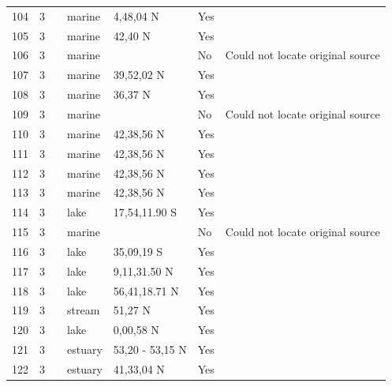 \documentclass[12pt]{article}
\begin{document}
\begin{landscape}
\begin{table}[h!]
{\begin{tabular}{p{2.8cm}p{1.3cm}p{3cm}p{2.2cm}p{2.5cm}lp{8.2cm}}
        104   & 3 & \cite{Menge1976}  & marine & 4,48,04 N & Yes   &       \\
        105   & 3 & \cite{Edwards1982}  & marine & 42,40 N & Yes   &       \\
        106   & 3 & \cite{Glynn1965}  & marine &       & No    & Could not locate original source \\
        107   & 3 & \cite{Peterson1979}  & marine & 39,52,02 N & Yes   &       \\
        108   & 3 & \cite{Hewatt1937}  & marine & 36,37 N & Yes   &       \\
        109   & 3 & \cite{Castilla1981} & marine &       & No    & Could not locate original source \\
        110   & 3 & \cite{Dexter1947}  & marine & 42,38,56 N & Yes   &       \\
        111   & 3 & \cite{Dexter1947}  & marine & 42,38,56 N & Yes   &       \\
        112   & 3 & \cite{Dexter1947}  & marine & 42,38,56 N & Yes   &       \\
        113   & 3 & \cite{Dexter1947}  & marine & 42,38,56 N & Yes   &       \\
        114   & 3 & \cite{Marshall1982}  & lake  & 17,54,11.90 S & Yes  &    \\
        115   & 3 & \cite{Koepcke1952}  & marine &       & No    & Could not locate original source \\
        116   & 3 & \cite{Hurlbert1972}  & lake  & 35,09,19 S & Yes   &       \\
        117   & 3 & \cite{Zaret1973}  & lake  & 9,11,31.50 N & Yes &     \\
        118   & 3 & \cite{Bindloss1972}  & lake  & 56,41,18.71 N & Yes   &       \\
        119   & 3 & \cite{Mann1972}  & stream & 51,27 N & Yes  &       \\
        120   & 3 & \cite{Moriarty1973}  & lake  & 0,00,58 N & Yes  &     \\
        121   & 3 & \cite{VanEs1977}  & estuary & 53,20 - 53,15 N & Yes   &       \\
        122   & 3 & \cite{Nixon1973}  & estuary & 41,33,04 N & Yes   &       \\
        \hline
      \end{tabular}}%
      \end{table}

        \newpage



\end{landscape}
\end{document}
